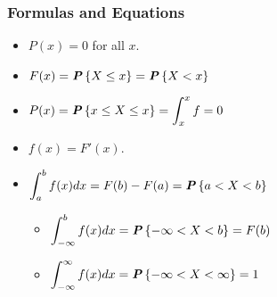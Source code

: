 \begin{multicols}{2}
\subsubsection{Formulas and Equations}
\begin{itemize}
  \item $P(x) = 0$ for all $x$.
  \item $F(x) = \textbf{\textit{P}}\left\{X \leq x\right\} = \textbf{\textit{P}}\left\{X < x\right\}$
  \item $\begin{aligned}
    P(x) = \textbf{\textit{P}}\left\{x \leq X \leq x\right\} = \int_x^x f = 0
  \end{aligned}$
  \item $f(x) = F'(x)$.
  \item $\begin{aligned}
    \int_a^b f(x)dx = F(b) - F(a) = \textbf{\textit{P}}\left\{a < X < b\right\}
  \end{aligned}$
  \begin{itemize}
      \item $\begin{aligned}
        \int_{-\infty}^b f(x)dx &= \textbf{\textit{P}}\left\{-\infty < X < b\right\} = F(b)
      \end{aligned}$
      \item $\begin{aligned}
        \int_{-\infty}^{\infty} f(x)dx &= \textbf{\textit{P}}\left\{-\infty < X < {\infty}\right\} = 1
      \end{aligned}$
  \end{itemize}
\end{itemize}

\end{multicols}

